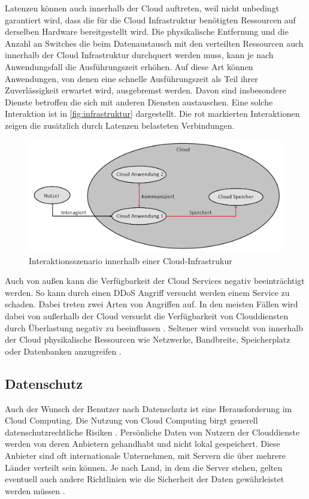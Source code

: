 Latenzen können auch innerhalb der Cloud auftreten, weil nicht unbedingt garantiert wird, dass die für die Cloud Infrastruktur benötigten Ressourcen auf derselben Hardware bereitgestellt wird. 
Die physikalische Entfernung und die Anzahl an Switches die beim Datenaustausch mit den verteilten Ressourcen auch innerhalb der Cloud Infrastruktur durchquert werden muss, kann je nach Anwendungsfall die Ausführungszeit erhöhen.
Auf diese Art können Anwendungen, von denen eine schnelle Ausführungszeit als Teil ihrer Zuverlässigkeit erwartet wird, ausgebremst werden. Davon sind insbesondere Dienste betroffen die sich mit anderen Diensten austauschen. Eine solche Interaktion ist in \autoref{fig:infrastruktur} dargestellt. Die rot markierten Interaktionen zeigen die zusätzlich durch Latenzen belasteten Verbindungen. 

\begin{figure}[b]
	\centering
	\includegraphics[width=\linewidth]{images/cloudstruktur.png}	
	\caption{Interaktionsszenario innerhalb einer Cloud-Infrastrukur}
	\label{fig:infrastruktur}
\end{figure}

Auch von außen kann die Verfügbarkeit der Cloud Services negativ beeinträchtigt werden. So kann durch einen DDoS Angriff versucht werden einem Service zu schaden. Dabei treten zwei Arten von Angriffen auf. In den meisten Fällen wird dabei von außerhalb der Cloud versucht die Verfügbarkeit von Clouddiensten durch Überlastung negativ zu beeinflussen \cite{darwish2013}. Seltener wird versucht von innerhalb der Cloud physikalische Ressourcen wie Netzwerke, Bandbreite, Speicherplatz oder Datenbanken anzugreifen \cite{darwish2013}.

\subsection{Datenschutz}
Auch der Wunsch der Benutzer nach Datenschutz ist eine Herausforderung im Cloud Computing. Die Nutzung von Cloud Computing birgt generell datenschutzrechtliche Risiken \cite{selzer2020}. 
Persönliche Daten von Nutzern der Clouddienste werden von deren Anbietern gehandhabt und nicht lokal gespeichert. 
Diese Anbieter sind oft internationale Unternehmen, mit Servern die über mehrere Länder verteilt sein können. Je nach Land, in dem die Server stehen, gelten eventuell auch andere Richtlinien wie die Sicherheit der Daten gewährleistet werden müssen \cite{selzer2020}.

